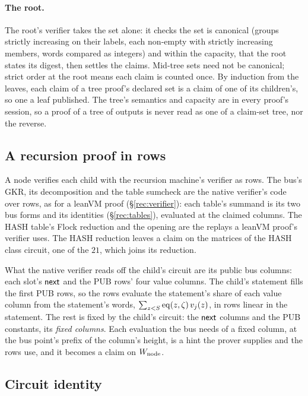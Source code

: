 \paragraph{The root.} The root's verifier takes the set alone: it checks the set is canonical (groups strictly increasing on their labels, each non-empty with strictly increasing members, words compared as integers) and within the capacity, that the root states its digest, then settles the claims. Mid-tree sets need not be canonical; strict order at the root means each claim is counted once. By induction from the leaves, each claim of a tree proof's declared set is a claim of one of its children's, so one a leaf published. The tree's semantics and capacity are in every proof's session, so a proof of a tree of outputs is never read as one of a claim-set tree, nor the reverse.

\subsection{A recursion proof in rows}\label{rec:child}

A node verifies each child with the recursion machine's verifier as rows. The bus's GKR, its decomposition and the table sumcheck are the native verifier's code over rows, as for a leanVM proof (\S\ref{rec:verifier}): each table's summand is its two bus forms and its identities (\S\ref{rec:tables}), evaluated at the claimed columns. The \textsf{HASH} table's Flock reduction and the opening are the replays a leanVM proof's verifier uses. The \textsf{HASH} reduction leaves a claim on the matrices of the \textsf{HASH} class circuit, one of the $21$, which joins its reduction.

What the native verifier reads off the child's circuit are its public bus columns: each slot's $\mathsf{next}$ and the \textsf{PUB} rows' four value columns. The child's statement fills the first \textsf{PUB} rows, so the rows evaluate the statement's share of each value column from the statement's words, $\sum_{z<S}\operatorname{eq}(z,\zeta)\,v_j(z)$, in rows linear in the statement. The rest is fixed by the child's circuit: the $\mathsf{next}$ columns and the \textsf{PUB} constants, its \emph{fixed columns}. Each evaluation the bus needs of a fixed column, at the bus point's prefix of the column's height, is a hint the prover supplies and the rows use, and it becomes a claim on $W_{\mathrm{node}}$.

\subsection{Circuit identity}\label{rec:identity}

